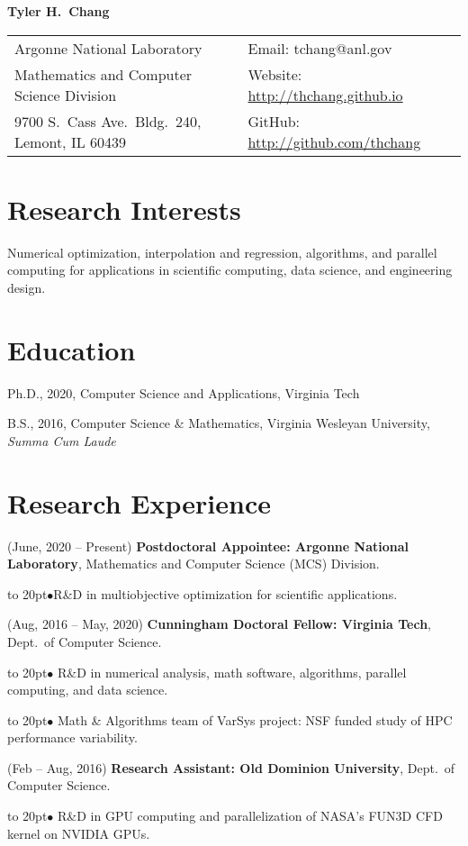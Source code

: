 \documentclass[12pt]{article}
\def\bullitem{\par\hangindent=15pt \hangafter=1
\noindent\hbox to 20pt{\hfil$\bullet$\hfil}\ignorespaces}
\begin{document}
{\Large \textbf{Tyler H.\ Chang}}

\begin{tabular}{ll}
   Argonne National Laboratory & Email: tchang@anl.gov\\
   Mathematics and Computer Science Division
      & Website: \url{http://thchang.github.io}\\
   9700 S.\ Cass Ave.\ Bldg.\ 240, Lemont, IL 60439
      & GitHub: \url{http://github.com/thchang} \\
\end{tabular}

\section*{Research Interests}

Numerical optimization, interpolation and regression, algorithms, and
parallel computing for applications in scientific computing,
data science, and engineering design.

\section*{Education}

Ph.D., 2020, Computer Science and Applications, Virginia Tech

\medskip

B.S., 2016, Computer Science \& Mathematics,
Virginia Wesleyan University, \textit{Summa Cum Laude}

\section*{Research Experience}

\hangindent=0.3in
(June, 2020 -- Present)
\textbf{Postdoctoral Appointee: Argonne National Laboratory},
Mathematics and Computer Science (MCS) Division.
\bullitem R\&D in multiobjective optimization for scientific applications.

\medskip

\hangindent=0.3in
(Aug, 2016 -- May, 2020)
\textbf{Cunningham Doctoral Fellow: Virginia Tech},
Dept.\ of Computer Science.
\bullitem
R\&D in numerical analysis, math software,
algorithms, parallel computing, and data science.
\bullitem
Math \& Algorithms team of VarSys project: NSF funded study of
HPC performance variability.

\medskip

\hangindent=0.3in
(Feb -- Aug, 2016)
\textbf{Research Assistant: Old Dominion University},
Dept.\ of Computer Science.
\bullitem
R\&D in GPU computing and parallelization of NASA's FUN3D CFD kernel on
NVIDIA GPUs.
\end{document}
